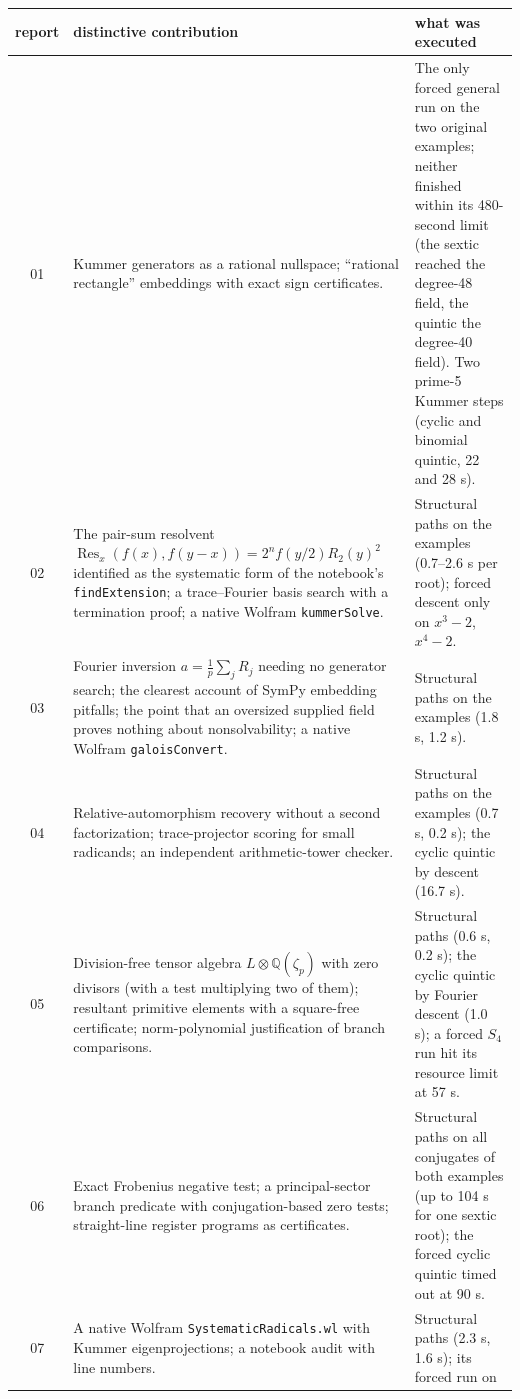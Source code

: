 \documentclass[11pt,a4paper]{article}
\theoremstyle{definition}
\theoremstyle{remark}
\newcommand{\Q}{\mathbb{Q}}
\newcommand{\Res}{\operatorname{Res}}
\newcommand{\code}[1]{\texttt{#1}}
\begin{document}
\begin{table}[htbp]
\centering\small
\begin{tabularx}{\textwidth}{@{}c>{\raggedright\arraybackslash}X>{\raggedright\arraybackslash}X@{}}
\toprule
report & distinctive contribution & what was executed\\
\midrule
01 & Kummer generators as a rational nullspace; ``rational rectangle'' embeddings
with exact sign certificates. & The only forced general run on the two original
examples; neither finished within its 480-second limit (the sextic reached the degree-48
field, the quintic the degree-40 field).  Two prime-5 Kummer steps (cyclic and binomial
quintic, 22 and 28 s).\\
02 & The pair-sum resolvent $\Res_x(f(x),f(y-x))=2^nf(y/2)R_2(y)^2$ identified as the
systematic form of the notebook's \code{findExtension}; a trace--Fourier basis search
with a termination proof; a native Wolfram \code{kummerSolve}. & Structural paths on the
examples (0.7--2.6 s per root); forced descent only on $x^3-2$, $x^4-2$.\\
03 & Fourier inversion $a=\frac1p\sum_jR_j$ needing no generator search; the clearest
account of SymPy embedding pitfalls; the point that an oversized supplied field proves
nothing about nonsolvability; a native Wolfram \code{galoisConvert}. & Structural paths
on the examples (1.8 s, 1.2 s).\\
04 & Relative-automorphism recovery without a second factorization; trace-projector
scoring for small radicands; an independent arithmetic-tower checker. & Structural paths
on the examples (0.7 s, 0.2 s); the cyclic quintic by descent (16.7 s).\\
05 & Division-free tensor algebra $L\otimes\Q(\zeta_p)$ with zero divisors (with a test
multiplying two of them); resultant primitive elements with a square-free certificate;
norm-polynomial justification of branch comparisons. & Structural paths (0.6 s, 0.2 s);
the cyclic quintic by Fourier descent (1.0 s); a forced $S_4$ run hit its resource limit
at 57 s.\\
06 & Exact Frobenius negative test; a principal-sector branch predicate with
conjugation-based zero tests; straight-line register programs as certificates. &
Structural paths on all conjugates of both examples (up to 104 s for one sextic root);
the forced cyclic quintic timed out at 90 s.\\
07 & A native Wolfram \code{SystematicRadicals.wl} with Kummer eigenprojections; a
notebook audit with line numbers. & Structural paths (2.3 s, 1.6 s); its forced run on

\end{tabularx}
\end{table}
\end{document}

